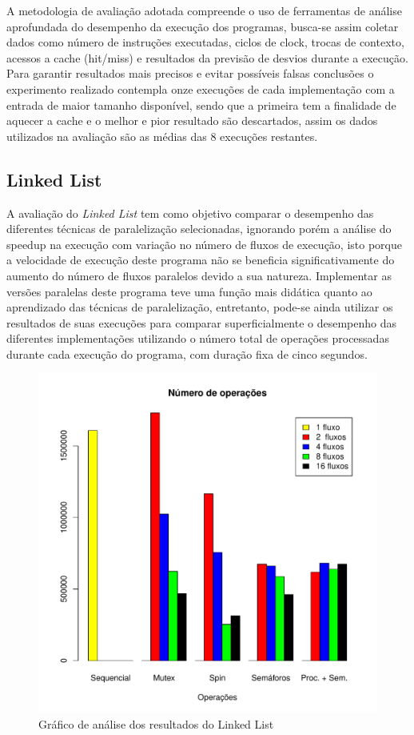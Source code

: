 \documentclass[12pt]{article}
\begin{document}
A metodologia de avaliação adotada compreende o uso de ferramentas de análise aprofundada do desempenho da execução dos programas, busca-se assim coletar dados como número de instruções executadas, ciclos de clock, trocas de contexto, acessos a cache (hit/miss) e resultados da previsão de desvios durante a execução. Para garantir resultados mais precisos e evitar possíveis falsas conclusões o experimento realizado contempla onze execuções de cada implementação com a entrada de maior tamanho disponível, sendo que a primeira tem a finalidade de aquecer a cache e o melhor e pior resultado são descartados, assim os dados utilizados na avaliação são as médias das 8 execuções restantes.

\subsection{Linked List}
A avaliação do \textit{Linked List} tem como objetivo comparar o desempenho das diferentes técnicas de paralelização selecionadas, ignorando porém a análise do speedup na execução com variação no número de fluxos de execução, isto porque a velocidade de execução deste programa não se beneficia significativamente do aumento do número de fluxos paralelos devido a sua natureza. Implementar as versões paralelas deste programa teve uma função mais didática quanto ao aprendizado das técnicas de paralelização, entretanto, pode-se ainda utilizar os resultados de suas execuções para comparar superficialmente o desempenho das diferentes implementações utilizando o número total de operações processadas durante cada execução do programa, com duração fixa de cinco segundos.

\begin{figure}[ht]
\centering
\includegraphics[width=.5\textwidth]{l_ops.pdf}
\caption{Gráfico de análise dos resultados do Linked List}
\label{fig:grafico1}
\end{figure}
\end{document}
